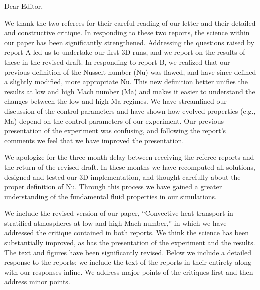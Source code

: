 \documentclass[aps, 11pt, singlecolumn]{revtex4-1} %
\begin{document}
\noindent
Dear Editor,
$\,$\newline

\newenvironment{myquotation}{
\begin{quotation}
\itshape
}{ 
\end{quotation}
}

\begin{singlespace}
We thank the two referees for their careful reading of our letter
and their detailed and constructive critique.
In responding to these two reports, the science within
our paper has been significantly strengthened.
Addressing the questions raised by report A led us to undertake
our first 3D runs, and we report on the results of these in the
revised draft.  In responding to report B,
we realized that our previous definition of the
Nusselt number (Nu) was flawed, and have since defined
a slightly modified, more appropriate Nu.  This new definition better unifies
the results at low and high Mach number (Ma) and makes it easier to understand
the changes between the low and high Ma regimes. We have streamlined our discussion
of the control parameters and have shown how evolved properties (e.g., Ma) depend
on the control parameters of our experiment.  Our previous presentation of the
experiment was confusing, and following the report's comments we feel that we
have improved the presentation.

We apologize for the three month delay between receiving the referee reports
and the return of the revised draft.  In these months we have
recomputed all solutions, designed and tested our 3D implementation, and
thought carefully about the proper definition of Nu.  Through this
process we have gained a greater understanding of the fundamental
fluid properties in our simulations.  


We include the revised version of our paper, ``Convective heat transport in stratified
atmospheres at low and high Mach number,'' in which we have addressed the critique contained
in both reports.  We think the science has been substantially improved, as has
the presentation of the experiment and the results.  The text and figures have been significantly
revised.  
Below we include a detailed response to the reports; we include the text of
the reports in their entirety along with our responses inline.  We address major
points of the critiques first and then address minor points.



\end{singlespace}
\end{document}
